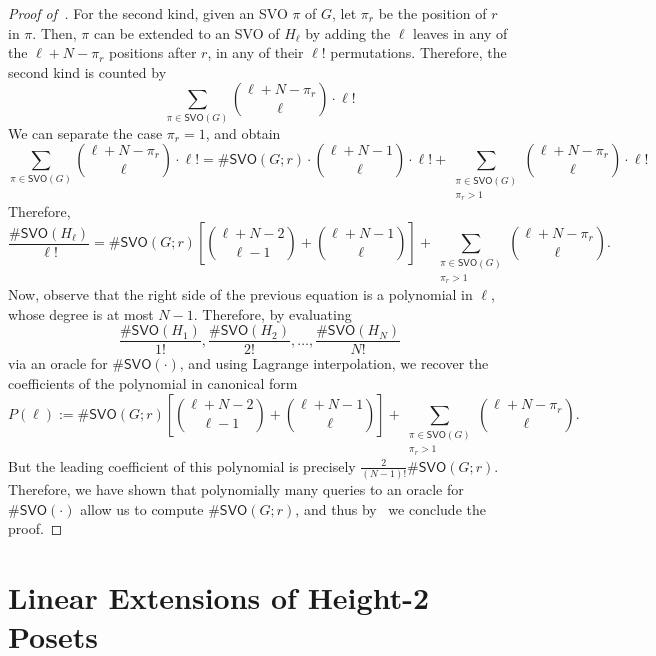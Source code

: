 \documentclass[11pt]{amsart}
\begin{document}
\begin{proof}[Proof of~]
    For the second kind, given an SVO $\pi$ of $G$, let $\pi_r$ be the position of $r$ in $\pi$. Then, $\pi$ can be extended to an SVO of $H_\ell$ by adding the $\ell$ leaves in any of the $\ell+N - \pi_r$ positions after $r$, in any of their $\ell!$ permutations. Therefore, the second kind is counted by
    \[
    \sum_{\pi \in \mathsf{SVO}(G)} \binom{\ell+N - \pi_r}{\ell} \cdot \ell!
    \]
    We can separate the case $\pi_r = 1$, and obtain
    \[
    \sum_{\pi \in \mathsf{SVO}(G)} \binom{\ell+N - \pi_r}{\ell} \cdot \ell! = \# \mathsf{SVO}(G; r) \cdot \binom{\ell+N-1}{\ell} \cdot \ell! + \sum_{\substack{\pi \in \mathsf{SVO}(G)\\ \pi_r > 1}} \binom{\ell+N - \pi_r}{\ell} \cdot \ell!
    \]
    Therefore,
    \[
    \frac{\#\mathsf{SVO}(H_\ell)}{\ell!} = \# \mathsf{SVO}(G; r)\left[\binom{\ell+N-2}{\ell-1} +  \binom{\ell+N-1}{\ell} \right] + \sum_{\substack{\pi \in \mathsf{SVO}(G)\\ \pi_r > 1}} \binom{\ell+N - \pi_r}{\ell}.
    \]
    Now, observe that the right side of the previous equation is a polynomial in $\ell$, whose degree is at most $N-1$. Therefore, by evaluating 
    \[
    \frac{\#\mathsf{SVO}(H_1)}{1!}, \frac{\#\mathsf{SVO}(H_2)}{2!}, \dots, \frac{\#\mathsf{SVO}(H_{N})}{N!}
    \]
    via an oracle for $\#\mathsf{SVO}(\cdot)$, and using Lagrange interpolation, we recover the coefficients of the polynomial in canonical form
    \[
    P(\ell) := \# \mathsf{SVO}(G; r)\left[\binom{\ell+N-2}{\ell-1} +  \binom{\ell+N-1}{\ell} \right] + \sum_{\substack{\pi \in \mathsf{SVO}(G)\\ \pi_r > 1}} \binom{\ell+N - \pi_r}{\ell}.
    \]
    But the leading coefficient of this polynomial is precisely $\frac{2}{(N-1)!}\#\mathsf{SVO}(G; r)$. Therefore, we have shown that polynomially many queries to an oracle for $\#\mathsf{SVO}(\cdot)$ allow us to compute $\#\mathsf{SVO}(G; r)$, and thus by~ we conclude the proof.
\end{proof}

\section{Linear Extensions of Height-2 Posets}

\end{document}
